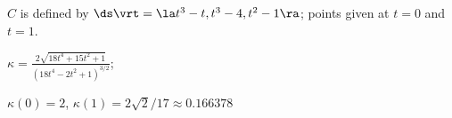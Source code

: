 {$C$ is defined by $\ds \vrt = \la t^3-t,t^3-4,t^2-1\ra $; points given at $t=0$ and $t=1$. 
}
{$\kappa = \frac{2 \sqrt{18 t^4+15t^2+1}}{\left(18 t^4-2t^2+1\right)^{3/2}}$;

$\kappa(0) = 2$, $\kappa(1) = 2\sqrt{2}/17\approx 0.166378$
}